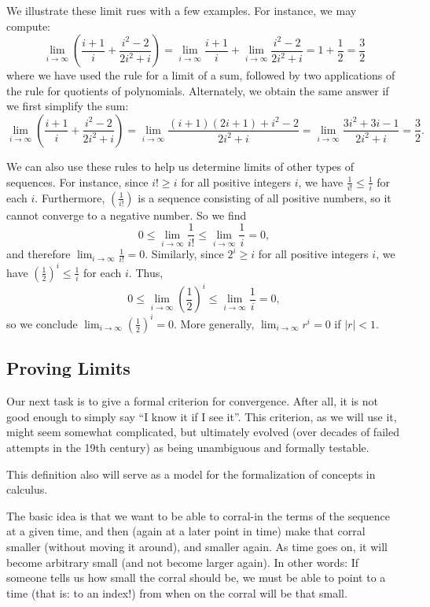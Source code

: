 We illustrate these limit rues with a few examples.
For instance, we may compute:
\[
\lim_{i \to \infty} \left( \frac{i+1}{i} + \frac{i^2-2}{2i^2+i} \right)
= \lim_{i \to \infty}  \frac{i+1}{i} + \lim_{i \to \infty} \frac{i^2-2}{2i^2+i} 
= 1 + \frac{1}{2} 
= \frac{3}{2}
\]
where we have used the rule for a limit of a sum, followed by two applications of the rule for quotients of polynomials.
Alternately, we obtain the same answer if we first simplify the sum:
\[
\lim_{i \to \infty} \left( \frac{i+1}{i} + \frac{i^2-2}{2i^2+i} \right)
= \lim_{i \to \infty} \frac{(i+1)(2i+1)+i^2-2}{2i^2+i}
= \lim_{i \to \infty} \frac{3i^2+3i-1}{2i^2+i}
=\frac{3}{2}.
\]

We can also use these rules to help us determine limits of other types of sequences.
For instance, since $i! \geq i$ for all positive integers $i$, we have $\frac{1}{i!} \leq \frac{1}{i}$ for each $i$. 
Furthermore, $\left( \frac{1}{i!} \right)$ is a sequence consisting of all positive numbers, so it cannot converge to a negative number.
So we find
\[
0 \leq \lim_{i \to \infty} \frac{1}{i!} \leq \lim_{i \to \infty} \frac{1}{i} = 0,
\]
and therefore $\lim_{i \to \infty} \frac{1}{i!} = 0$.
Similarly, since $2^i \geq i$ for all positive integers $i$, we have $\left(\frac{1}{2}\right)^i \leq \frac{1}{i}$ for each $i$.
Thus,
\[
0 \leq \lim_{i \to \infty} \left(\frac{1}{2}\right)^i \leq \lim_{i \to \infty} \frac{1}{i} = 0,
\]
so we conclude $\lim_{i \to \infty} \left(\frac{1}{2}\right)^i = 0$.
More generally, $\lim_{i \to \infty} r^i = 0$ if $|r|<1$.

\subsection{Proving Limits}

Our next task is to give a formal criterion for convergence. After all, it is not good
enough to simply say ``I know it if I see it''. This criterion, as we will use it, might
seem somewhat complicated, but ultimately evolved (over decades of failed attempts in the
19th century) as being unambiguous and formally testable. 

This definition also will serve as a model for the formalization of concepts in calculus.
\medskip

The basic idea is that we want to be able to corral-in the terms of the
sequence at a given time, and then (again at a
later point in time) make that corral smaller (without moving it around), and
smaller again.  As time goes on, it will become arbitrary small (and not
become larger again).  In other words: If someone tells us how small the
corral should be, we must be able to point to a time (that is: to an index!)
from when on the corral will be that small.

